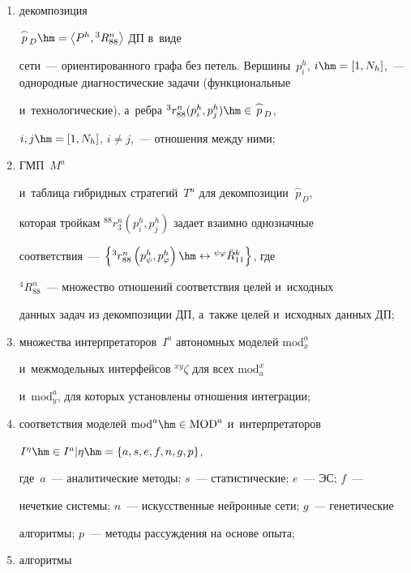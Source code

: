 \begin{enumerate}[(1)]

\item декомпозиция 

$\overset{\frown}{p}_D\hm= \left\langle P^h, {}^3R_{88}^n\right\rangle$ ДП в~виде  

сети~--- ориентированного графа без петель. Вершины~$p_i^h$, $i\hm= [1, 

N_h]$,~--- однородные диагностические задачи (функциональные 

и~технологические), а~ребра ${}^3r^n_{88}(p_i^h, p_j^h)\hm\in \overset{\frown}{p}_D$, 

$i,j \hm= [1, N_h]$, $i\not= j$,~--- отношения между ними; 

\item ГМП~$M^a$ 

и~таб\-ли\-ца гибридных стратегий~$T^u$ для декомпозиции~$\overset{\frown}{p}_D$, 

которая тройкам ${}^{88} r_3^n (p_i^h, p_j^h)$ задает взаимно однозначные 

соответствия~--- $\left\{ {}^3 r^n_{88} \left( p^h_\psi, p^h_\varphi\right) 

\hm\leftrightarrow {}^{\psi\varphi}\ddot{R}^k_{11}\right\}$, где  

${}^4 R^n_{88}$~--- множество отношений  соответствия целей и~исходных 

данных задач из декомпозиции ДП, а~также целей и~исходных данных ДП; 

\item множества интерпретаторов~$I^a$ автономных моделей $\mathrm{mod}_x^a$ 

и~межмодельных интерфейсов ${}^{xy}\zeta$ для всех $\mathrm{mod}_a^x$ 

и~$\mathrm{mod}_y^a$, для которых установлены отношения интеграции; 

\item соответствия моделей $\mathrm{mod}^a\hm\in \mathrm{MOD}^a$ и~интерпретаторов 

$I^{\eta}\hm\in I^a\vert \eta \hm= \{a, s, e, f, n, g, p\}$,  

где~$a$~--- аналитические методы; $s$~--- статистические; $e$~--- ЭС; $f$~--- 

нечеткие системы; $n$~--- искусственные нейронные сети; $g$~--- генетические 

алгоритмы; $p$~--- методы рассуждения на основе опыта;

\item алгоритмы 


\end{enumerate}
